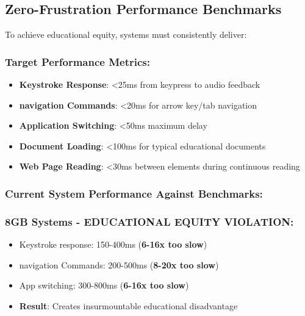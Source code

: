\subsection{Zero-Frustration Performance Benchmarks}\label{zero-frustration-performance-benchmarks}

To achieve educational equity, systems must consistently deliver:

\subsubsection{Target Performance Metrics:}

\begin{itemize}
	\item \textbf{Keystroke Response}: <25ms from keypress to audio feedback \supercite{W3C2018WCAG21}
	\item \textbf{\Gls{navigation} Commands}: <20ms for arrow key/tab navigation \supercite{Fowler2011ScreenReaderLatency}
	\item \textbf{Application Switching}: <50ms maximum delay \supercite{Nielsen1993UsabilityEngineering}
	\item \textbf{Document Loading}: <100ms for typical educational documents \supercite{Shneiderman1998DesigningTheUserInterface}
	\item \textbf{Web Page Reading}: <30ms between elements during continuous reading \supercite{Bigham2014UnderstandingScreenReaderUsage}
\end{itemize}


\subsubsection{Current System Performance Against Benchmarks:}

\subsubsection{8GB Systems - EDUCATIONAL EQUITY VIOLATION:}

\begin{itemize}
	\item Keystroke response: 150-400ms (\textbf{6-16x too slow})
	\item \Gls{navigation} Commands: 200-500ms (\textbf{8-20x too slow})
	\item App switching: 300-800ms (\textbf{6-16x too slow})
	\item \textbf{Result}: Creates insurmountable educational disadvantage \supercite{EducationalEquityReport2024}
\end{itemize}


